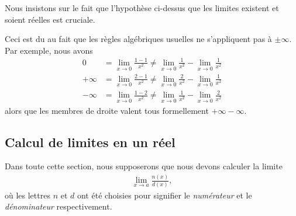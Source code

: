 \documentclass[main.tex]{subfiles}
\begin{document}
\begin{remark}
    Nous insistons sur le fait que l'hypothèse ci-dessus
    que les limites existent et soient réelles
    est cruciale.

    Ceci est du au fait
    que les règles algébriques usuelles ne s'appliquent pas à $\pm \infty$.
    Par exemple,
    nous avons
    \begin{align}
        0 &= \lim_{x \to 0} \frac {1 - 1} {x^2} \neq \lim_{x \to 0} \frac 1 {x^2} - \lim_{x \to 0} \frac 1 {x^2}\\
        +\infty &= \lim_{x \to 0} \frac {2 - 1} {x^2} \neq \lim_{x \to 0} \frac 2 {x^2} - \lim_{x \to 0} \frac 1 {x^2}\\
        -\infty &= \lim_{x \to 0} \frac {1 - 2} {x^2} \neq \lim_{x \to 0} \frac 1 {x^2} - \lim_{x \to 0} \frac 2 {x^2}
    \end{align}
    alors que les membres de droite valent tous formellement $+\infty - \infty$.
\end{remark}

\subsection{Calcul de limites en un réel}

Dans toute cette section,
nous supposerons que nous devons calculer la limite
\begin{align}
    \lim_{x \to a} \frac {n(x)} {d(x)},
\end{align}
où les lettres $n$ et $d$ ont été choisies
pour signifier le \emph{numérateur} et le \emph{dénominateur} respectivement.
\end{document}

